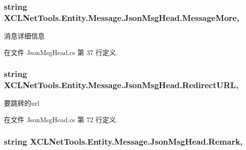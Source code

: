 \subsubsection[{\texorpdfstring{Message\+More}{MessageMore}}]{\setlength{\rightskip}{0pt plus 5cm}string X\+C\+L\+Net\+Tools.\+Entity.\+Message.\+Json\+Msg\+Head.\+Message\+More\hspace{0.3cm}{\ttfamily [get]}, {\ttfamily [set]}}\hypertarget{class_x_c_l_net_tools_1_1_entity_1_1_message_1_1_json_msg_head_a5f65bd454c47d349a2a0fae291c73590}{}\label{class_x_c_l_net_tools_1_1_entity_1_1_message_1_1_json_msg_head_a5f65bd454c47d349a2a0fae291c73590}


消息详细信息 



在文件 Json\+Msg\+Head.\+cs 第 37 行定义.

\subsubsection[{\texorpdfstring{Redirect\+U\+RL}{RedirectURL}}]{\setlength{\rightskip}{0pt plus 5cm}string X\+C\+L\+Net\+Tools.\+Entity.\+Message.\+Json\+Msg\+Head.\+Redirect\+U\+RL\hspace{0.3cm}{\ttfamily [get]}, {\ttfamily [set]}}\hypertarget{class_x_c_l_net_tools_1_1_entity_1_1_message_1_1_json_msg_head_aa3e8eb7bf16a7a3abea7e7797488685e}{}\label{class_x_c_l_net_tools_1_1_entity_1_1_message_1_1_json_msg_head_aa3e8eb7bf16a7a3abea7e7797488685e}


要跳转的url 



在文件 Json\+Msg\+Head.\+cs 第 72 行定义.

\subsubsection[{\texorpdfstring{Remark}{Remark}}]{\setlength{\rightskip}{0pt plus 5cm}string X\+C\+L\+Net\+Tools.\+Entity.\+Message.\+Json\+Msg\+Head.\+Remark\hspace{0.3cm}{\ttfamily [get]}, {\ttfamily [set]}}\hypertarget{class_x_c_l_net_tools_1_1_entity_1_1_message_1_1_json_msg_head_a95aa829e5dab2ac6f54c1ca56f933467}{}\label{class_x_c_l_net_tools_1_1_entity_1_1_message_1_1_json_msg_head_a95aa829e5dab2ac6f54c1ca56f933467}


